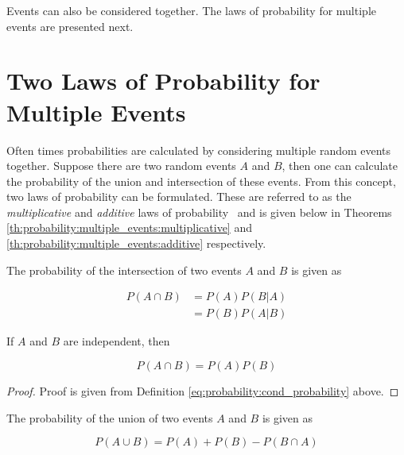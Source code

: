 Events can also be considered together. The laws of probability for multiple events are presented next.

\section{Two Laws of Probability for Multiple Events}
\label{sec:probability:multiple_events}

Often times probabilities are calculated by considering multiple random events together. Suppose there are two random events $A$ and $B$, then one can calculate the probability of the union and intersection of these events. From this concept, two laws of probability can be formulated. These are referred to as the \textit{multiplicative} and \textit{additive} laws of probability~\cite{ref:wackerly:2014} and is given below in Theorems \ref{th:probability:multiple_events:multiplicative} and \ref{th:probability:multiple_events:additive} respectively.

\begin{theorem}
      \label{th:probability:multiple_events:multiplicative}
      The probability of the intersection of two events $A$ and $B$ is given as

      \begin{equation*}
            \begin{split}
                  P(A \cap B)
                  &= P(A)P(B \vert A) \\
                  &= P(B)P(A \vert B)
            \end{split}
      \end{equation*}

      If $A$ and $B$ are independent, then

      \begin{equation*}
            P(A \cap B) = P(A)P(B)
      \end{equation*}
\end{theorem}

\begin{proof}
      Proof is given from Definition \ref{eq:probability:cond_probability} above.
\end{proof}

\begin{theorem}
      \label{th:probability:multiple_events:additive}
      The probability of the union of two events $A$ and $B$ is given as

      \begin{equation*}
            P(A \cup B) = P(A) + P(B) - P(B \cap A)
      \end{equation*}
\end{theorem}

